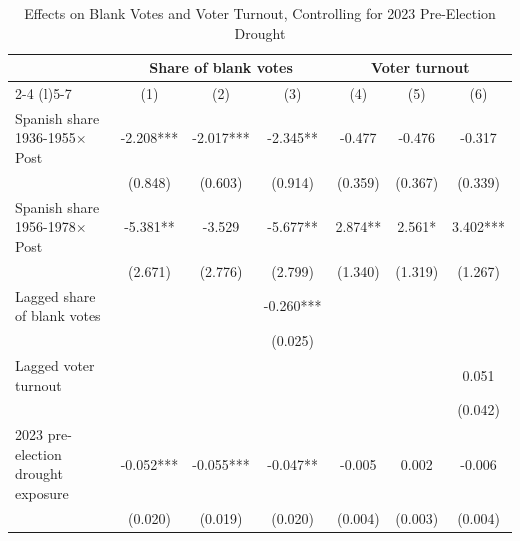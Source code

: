\begin{table}[!h]
\caption{Effects on Blank Votes and Voter Turnout, Controlling for 2023 Pre-Election Drought}
\renewcommand{\arraystretch}{1.25}
\setlength{\tabcolsep}{6pt}
\centering
\begin{tabular}[t]{lcccccc}
\hline
 & \multicolumn{3}{c}{Share of blank votes} & \multicolumn{3}{c}{Voter turnout} \\
\cmidrule(l){2-4} \cmidrule(l){5-7}
  & (1) & (2) & (3) & (4) & (5) & (6)\\
\hline
Spanish share 1936-1955$\times$Post & -2.208*** & -2.017*** & -2.345** & -0.477 & -0.476 & -0.317\\
 & (0.848) & (0.603) & (0.914) & (0.359) & (0.367) & (0.339)\\
Spanish share 1956-1978$\times$Post & -5.381** & -3.529 & -5.677** & 2.874** & 2.561* & 3.402***\\
 & (2.671) & (2.776) & (2.799) & (1.340) & (1.319) & (1.267)\\
Lagged share of blank votes &  &  & -0.260*** &  &  & \\
 &  &  & (0.025) &  &  & \\
Lagged voter turnout &  &  &  &  &  & 0.051\\
 &  &  &  &  &  & (0.042)\\
2023 pre-election drought exposure & -0.052*** & -0.055*** & -0.047** & -0.005 & 0.002 & -0.006\\
 & (0.020) & (0.019) & (0.020) & (0.004) & (0.003) & (0.004)\\


\end{tabular}
\end{table}
